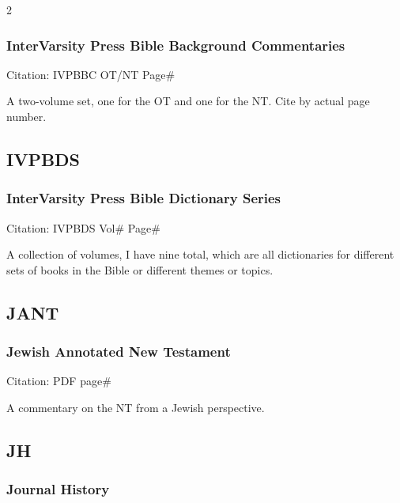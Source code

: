 \begin{multicols}{2}
		\subsubsection*{InterVarsity Press Bible Background Commentaries}
		
			Citation:
				IVPBBC OT/NT Page\#
				
			A two-volume set, one for the OT and one for the NT. Cite by actual page number.
	
	\subsection*{IVPBDS}
	
		\subsubsection*{InterVarsity Press Bible Dictionary Series}
		
			Citation:
				IVPBDS Vol\# Page\#
				
			A collection of volumes, I have nine total, which are all dictionaries for different sets of books in the Bible or different themes or topics. 
			
	\subsection*{JANT}
	
		\subsubsection*{Jewish Annotated New Testament}
		
			Citation:
				PDF page\#
		
			A commentary on the NT from a Jewish perspective.
	
	\subsection*{JH}
	
		\subsubsection*{Journal History}
		

\end{multicols}
